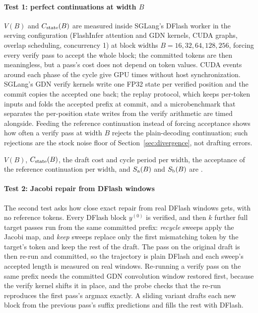 \paragraph{Test 1: perfect continuations at width $B$}\label{sec:repair-stagea}
$V(B)$ and $C_{\rm state}(B)$ are measured inside SGLang's DFlash worker in the serving configuration (FlashInfer attention and GDN kernels, CUDA graphs, overlap scheduling, concurrency 1) at block widths $B=16,32,64,128,256$, forcing every verify pass to accept the whole block; the committed tokens are then meaningless, but a pass's cost does not depend on token values. CUDA events around each phase of the cycle give GPU times without host synchronization. SGLang's GDN verify kernels write one FP32 state per verified position and the commit copies the accepted one back; the replay protocol, which keeps per-token inputs and folds the accepted prefix at commit, and a microbenchmark that separates the per-position state writes from the verify arithmetic are timed alongside. Feeding the reference continuation instead of forcing acceptance shows how often a verify pass at width $B$ rejects the plain-decoding continuation; such rejections are the stock noise floor of Section~\ref{sec:divergence}, not drafting errors.

$V(B)$, $C_{\rm state}(B)$, the draft cost and cycle period per width, the acceptance of the reference continuation per width, and $S_{\rm a}(B)$ and $S_{\rm b}(B)$ are .

\paragraph{Test 2: Jacobi repair from DFlash windows}\label{sec:repair-jacobi}
The second test asks how close exact repair from real DFlash windows gets, with no reference tokens. Every DFlash block $y^{(0)}$ is verified, and then $k$ further full target passes run from the same committed prefix: \emph{recycle} sweeps apply the Jacobi map, and \emph{keep} sweeps replace only the first mismatching token by the target's token and keep the rest of the draft. The pass on the original draft is then re-run and committed, so the trajectory is plain DFlash and each sweep's accepted length is measured on real windows. Re-running a verify pass on the same prefix needs the committed GDN convolution window restored first, because the verify kernel shifts it in place, and the probe checks that the re-run reproduces the first pass's argmax exactly. A sliding variant drafts each new block from the previous pass's suffix predictions and fills the rest with DFlash.

